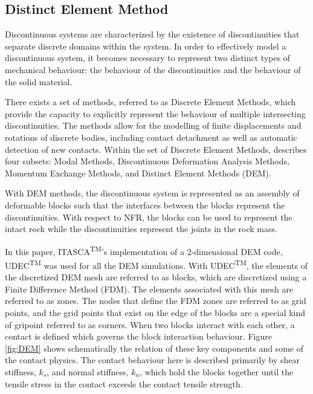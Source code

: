 \subsection{Distinct Element Method}
Discontinuous systems are characterized by the existence of discontinuities that separate discrete domains within the system. In order to effectively model a discontinuous system, it becomes necessary to represent two distinct types of mechanical behaviour: the behaviour of the discontinuities and the behaviour of the solid material.

There exists a set of methods, referred to as Discrete Element Methods, which provide the capacity to explicitly represent the behaviour of multiple intersecting discontinuities. The methods allow for the modelling of finite displacements and rotations of discrete bodies, including contact detachment as well as automatic detection of new contacts. Within the set of Discrete Element Methods, \citet{CUNDALL_1992} describes four subsets: Modal Methods, Discontinuous Deformation Analysis Methods, Momentum Exchange Methods, and Distinct Element Methods (DEM).


With DEM methods, the discontinuous system is represented as an assembly of deformable blocks such that the interfaces between the blocks represent the discontinuities. With respect to NFR, the blocks can be used to represent the intact rock while the discontinuities represent the joints in the rock mass. 

In this paper, ITASCA\textsuperscript{TM}'s implementation of a 2-dimensional DEM code, UDEC\textsuperscript{TM} was used for all the DEM simulations. With UDEC\textsuperscript{TM}, the elements of the discretized DEM mesh are referred to as blocks, which are discretized using a Finite Difference Method (FDM). The elements associated with this mesh are referred to as zones. The nodes that define the FDM zones are referred to as grid points, and the grid points that exist on the edge of the blocks are a special kind of gripoint referred to as corners. When two blocks interact with each other, a contact is defined which governs the block interaction behaviour.  Figure \ref{fig:DEM} shows schematically the relation of these key components and some of the contact physics. The contact behaviour here is described primarily by shear stiffness, $k_s$, and normal stiffness, $k_n$, which hold the blocks together until the tensile stress in the contact exceeds the contact tensile strength. 